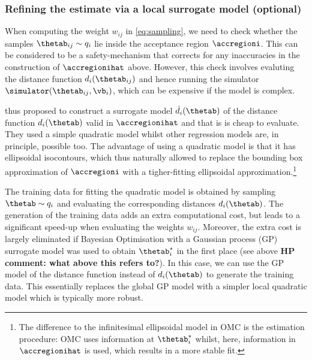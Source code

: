 \subsubsection*{Refining the estimate via a local surrogate model (optional)}
When computing the weight $w_{ij}$ in \eqref{eq:sampling}, we need to
check whether the samples $\thetab_{ij} \sim q_i$ lie inside the
acceptance region $\accregioni$. This can be considered to be a
safety-mechanism that corrects for any inaccuracies in the
construction of $\accregionihat$ above. However, this check involves
evaluting the distance function $d_i(\thetab_{ij})$ and hence running
the simulator $\simulator(\thetab_{ij}, \vb_i)$, which can be
expensive if the model is complex.

\citet{Ikonomov2019} thus proposed to construct a surrogate model $\hat{d}_i(\thetab)$
of the distance function $d_i(\thetab)$ valid in $\accregionihat$ and
that is is cheap to evaluate. They used a simple quadratic model
whilst other regression models are, in principle, possible too. The
advantage of using a quadratic model is that it has ellipsoidal
isocontours, which thus naturally allowed \citet{Ikonomov2019} to
replace the bounding box approximation of $\accregioni$ with a
tigher-fitting ellipsoidal approximation.\footnote{The difference to
the infinitesimal ellipsoidal model in OMC is the estimation procedure: OMC uses
information at $\thetab_i^*$ whilst, here, information in
$\accregionihat$ is used, which results in a more stable fit.}

The training data for fitting the quadratic model is obtained by
sampling $\thetab \sim q_i$ and evaluating the corresponding distances
$d_i(\thetab)$. The generation of the training data adds an extra
computational cost, but leads to a significant speed-up when
evaluating the weights $w_{ij}$. Moreover, the extra cost is largely
eliminated if Bayesian Optimisation with a Gaussian process (GP)
surrogate model was used to obtain $\thetab_i^*$ in the first place
(see above \textbf{HP comment: what above this refers to?}). In this case, we can use the GP model of the distance
function instead of $d_i(\thetab)$ to generate the training data. This
essentially replaces the global GP model with a simpler local
quadratic model which is typically more robust.